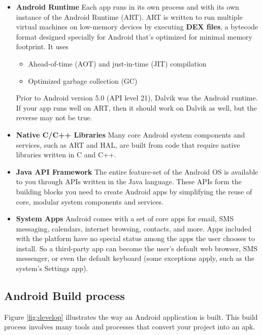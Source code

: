 \begin{itemize}
	\item \textbf{Android Runtime} Each app runs in its own process and with its own instance of the Android Runtime (ART).
		ART is written to run multiple virtual machines on low-memory devices by executing \textbf{DEX files}, a bytecode format designed specially for Android that's optimized for minimal memory footprint.
		It uses
		\begin{itemize}
			\item Ahead-of-time (AOT) and just-in-time (JIT) compilation \cite{}
			\item Optimized garbage collection (GC)
		\end{itemize}
		Prior to Android version 5.0 (API level 21), Dalvik was the Android runtime.
		If your app runs well on ART, then it should work on Dalvik as well, but the reverse may not be true.
		
	\item \textbf{Native C/C++ Libraries} Many core Android system components and services, such as ART and HAL, are built from code that require native libraries written in C and C++.
	
	\item \textbf{Java API Framework} The entire feature-set of the Android OS is available to you through APIs written in the Java language.
		These APIs form the building blocks you need to create Android apps by simplifying the reuse of core, modular system components and services.
		
	\item \textbf{System Apps} Android comes with a set of core apps for email, SMS messaging, calendars, internet browsing, contacts, and more.
		Apps included with the platform have no special status among the apps the user chooses to install.
		So a third-party app can become the user's default web browser, SMS messenger, or even the default keyboard (some exceptions apply, such as the system's Settings app).
\end{itemize}

\subsection{Android Build process}
Figure \ref{fig:develop} illustrates the way an Android application is built.
This build process involves many tools and processes that convert your project into an \gls{apk}.

